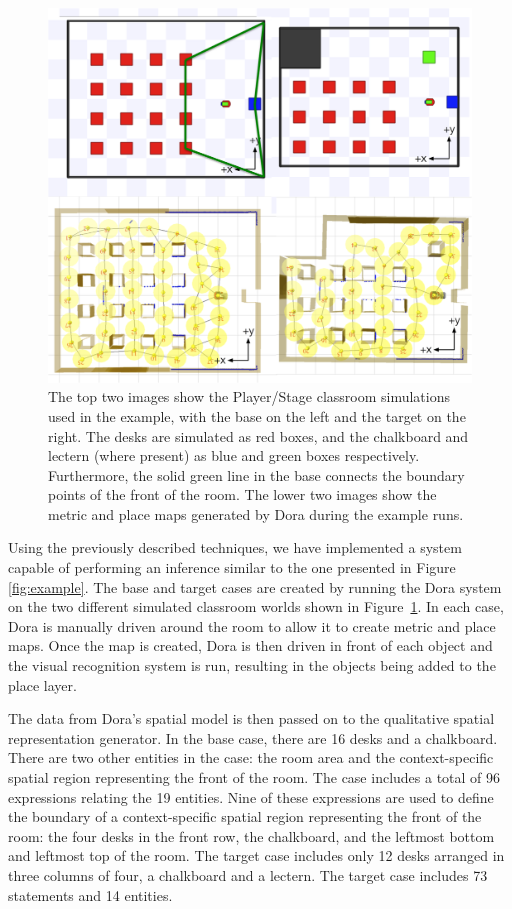 \documentclass[letterpaper]{article}
\begin{document}
\begin{figure}[t]
  \includegraphics[width=\columnwidth]{images/classroom-maps-axes-annotation.png}
  \caption{The top two images show the Player/Stage classroom simulations used in the example, with the base on the left and the target on the right. The desks are simulated as red boxes, and the chalkboard and lectern (where present) as blue and green boxes respectively. Furthermore, the solid green line in the base connects the boundary points of the front of the room. The lower two images show the metric and place maps generated by Dora during the example runs.}
  \label{fig:dora-maps}
\end{figure}

Using the previously described techniques, we have implemented a system capable of performing an inference similar to the one presented in Figure \ref{fig:example}. The base and target cases are created by running the Dora system on the two different simulated classroom worlds shown in Figure~\ref{fig:dora-maps}. In each case, Dora is manually driven around the room to allow it to create metric and place maps. Once the map is created, Dora is then driven in front of each object and the visual recognition system is run, resulting in the objects being added to the place layer. 

The data from Dora's spatial model is then passed on to the qualitative spatial representation generator. In the base case, there are 16 desks and a chalkboard. There are two other entities in the case: the room area and the context-specific spatial region representing the front of the room. The case includes a total of 96 expressions relating the 19 entities. Nine of these expressions are used to define the boundary of a context-specific spatial region representing the front of the room: the four desks in the front row, the chalkboard, and the leftmost bottom and leftmost top of the room. The target case includes only 12 desks arranged in three columns of four, a chalkboard and a lectern. The target case includes 73 statements and 14 entities.
\end{document}
